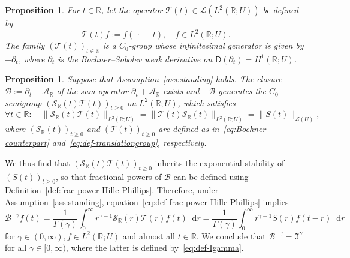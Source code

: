 \documentclass[reqno]{amsart}
\numberwithin{equation}{section}
\newcommand{\R}{\mathbb{R}}
\newcommand{\cA}{\mathcal{A}}
\newcommand{\cB}{\mathcal{B}}
\newcommand{\cS}{\mathcal{S}}
\newcommand{\cT}{\mathcal{T}}
\newcommand{\rd}{\mathop{}\!\mathrm{d}}
\newcommand{\clos}[1]{\overline{ #1 }}
\newtheorem{proposition}[lemma]{Proposition}
\theoremstyle{remark}
\theoremstyle{definition}
\begin{document}
\begin{proposition}
	For $t \in \R$, let the operator $\cT(t) \in \mathscr L(L^2(\R; U))$
	be defined by 
	\begin{equation}\label{eq:def-translationgroup}
		\cT(t) f := f(\,\cdot\, - t), \quad f \in L^2(\R; U).
	\end{equation}
	The family $(\cT(t))_{t\in\R}$ is a $C_0$-group whose infinitesimal
	generator is given by $-\partial_t$, where $\partial_t$ 
	is the Bochner--Sobolev weak derivative on 
	$\mathsf D(\partial_t) = H^1(\R; U)$.
\end{proposition}
%
\begin{proposition}\label{prop:parabolic-operator-semigroup}
	Suppose that Assumption~\textup{\ref{ass:standing}} holds.
	The closure $\cB := \clos{\partial_t + \cA_\R}$
	of the sum operator $\partial_t + \cA_\R$ exists and
	$-\cB$ generates the $C_0$-semigroup 
	$(\cS_\R(t)\cT(t))_{t\ge0}$ on $L^2(\R; U)$, which satisfies
	\[
	\forall t \in \R \colon 
	\quad 
	\| \cS_\R(t) \cT(t) \|_{L^2(\R; U)}
	=
	\| \cT(t) \cS_\R(t) \|_{L^2(\R; U)}
	=
	\| S(t) \|_{\mathscr L(U)},
	\]
	where $(\cS_\R(t))_{t\ge0}$ and $(\cT(t))_{t\ge0}$ are defined
	as in~\eqref{eq:Bochner-counterpart} and~\eqref{eq:def-translationgroup},
	respectively.
\end{proposition}
%
We thus find that $(\cS_\R(t)\cT(t))_{t\ge0}$ inherits the exponential
stability of $(S(t))_{t\ge0}$, so that fractional powers
of $\cB$ can be defined using Definition~\ref{def:frac-power-Hille-Phillips}. Therefore,
under Assumption~\ref{ass:standing}, equation~\eqref{eq:def-frac-power-Hille-Phillips} implies
%
\[
\cB^{-\gamma} f(t) 
= 
\frac{1}{\Gamma(\gamma)} 
\int_0^\infty r^{\gamma-1} \cS_\R(r) \cT(r) f(t) \rd r
=
\frac{1}{\Gamma(\gamma)} 
\int_0^\infty r^{\gamma-1} S(r) f(t-r) \rd r
\]
%
for $\gamma \in (0,\infty), f \in L^2(\R; U)$ and almost all $t \in \R$.
We conclude that $\cB^{-\gamma} = \mathfrak I^\gamma$ for 
all $\gamma \in [0,\infty)$, where the latter is defined by~\eqref{eq:def-Igamma}.





\end{document}
